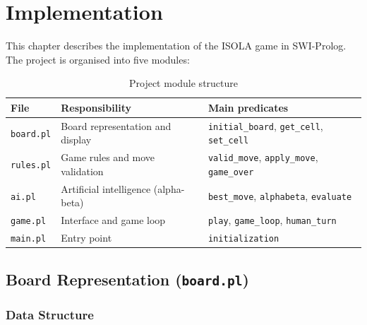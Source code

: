
\chapter{Implementation}
\label{chap:impl}

This chapter describes the implementation of the ISOLA game in SWI-Prolog.
The project is organised into five modules:

\begin{table}[htbp]
  \caption{Project module structure}
  \label{tab:modules}
  \centering
  \begin{tabular}{lll}
    \toprule
    \textbf{File} & \textbf{Responsibility} & \textbf{Main predicates} \\
    \midrule
    \texttt{board.pl}  & Board representation and display
                       & \texttt{initial\_board}, \texttt{get\_cell}, \texttt{set\_cell} \\
    \texttt{rules.pl}  & Game rules and move validation
                       & \texttt{valid\_move}, \texttt{apply\_move}, \texttt{game\_over} \\
    \texttt{ai.pl}     & Artificial intelligence (alpha-beta)
                       & \texttt{best\_move}, \texttt{alphabeta}, \texttt{evaluate} \\
    \texttt{game.pl}   & Interface and game loop
                       & \texttt{play}, \texttt{game\_loop}, \texttt{human\_turn} \\
    \texttt{main.pl}   & Entry point
                       & \texttt{initialization} \\
    \bottomrule
  \end{tabular}
\end{table}

\section{Board Representation (\texttt{board.pl})}
\label{sec:board}

\subsection{Data Structure}

